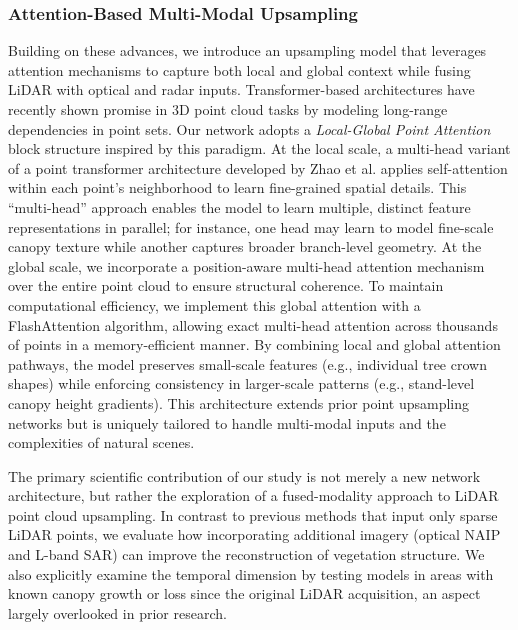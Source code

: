 \documentclass[remotesensing,article,submit,pdftex,moreauthors]{Definitions/mdpi}
\begin{document}
\subsubsection{Attention-Based Multi-Modal Upsampling}

Building on these advances, we introduce an upsampling model that leverages attention mechanisms to capture both local and global context while fusing LiDAR with optical and radar inputs. Transformer-based architectures have recently shown promise in 3D point cloud tasks by modeling long-range dependencies in point sets. Our network adopts a \emph{Local-Global Point Attention} block structure inspired by this paradigm. At the local scale, a multi-head variant of a point transformer architecture developed by Zhao et al. \cite{zhao2021point} applies self-attention within each point’s neighborhood to learn fine-grained spatial details. This “multi-head” approach enables the model to learn multiple, distinct feature representations in parallel; for instance, one head may learn to model fine-scale canopy texture while another captures broader branch-level geometry. At the global scale, we incorporate a position-aware multi-head attention mechanism over the entire point cloud to ensure structural coherence. To maintain computational efficiency, we implement this global attention with a FlashAttention \cite{dao2022flashattention} algorithm, allowing exact multi-head attention across thousands of points in a memory-efficient manner. By combining local and global attention pathways, the model preserves small-scale features (e.g., individual tree crown shapes) while enforcing consistency in larger-scale patterns (e.g., stand-level canopy height gradients). This architecture extends prior point upsampling networks but is uniquely tailored to handle multi-modal inputs and the complexities of natural scenes.

The primary scientific contribution of our study is not merely a new network architecture, but rather the exploration of a fused-modality approach to LiDAR point cloud upsampling. In contrast to previous methods that input only sparse LiDAR points, we evaluate how incorporating additional imagery (optical NAIP and L-band SAR) can improve the reconstruction of vegetation structure. We also explicitly examine the temporal dimension by testing models in areas with known canopy growth or loss since the original LiDAR acquisition, an aspect largely overlooked in prior research.
\end{document}
